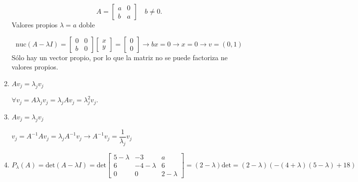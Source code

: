 \begin{enumerate}[label=\color{red}\textbf{\arabic*)}]
    \[
    A=\begin{bmatrix} 
        a & 0\\ b & a 
    \end{bmatrix} \quad b\neq 0.
    \] 
    Valores propios $\lambda = a$ doble

    \[
    \mathrm{nuc}(A-\lambda I)=\begin{bmatrix} 
        0 & 0\\
        b & 0
    \end{bmatrix}\begin{bmatrix} 
    x\\y 
    \end{bmatrix}  =\begin{bmatrix} 
    0\\0 
    \end{bmatrix} \longrightarrow bx=0\longrightarrow x=0\longrightarrow v=(0,1)
    \] 
    Sólo hay un vector propio, por lo que la matriz no se puede factoriza ne valores propios.
    \item {}

        $Av_j=\lambda_jv_j$

        $\forall v_j=A\lambda_jv_j=\lambda_jAv_j=\lambda_j^2v_j.$
    \item {}

        $Av_j=\lambda_jv_j$

        $v_{j}=A^{-1}Av_j=\lambda_jA^{-1}v_j\longrightarrow A^{-1}v_j=\dfrac{1}{\lambda_j}v_j$
    \item {}

    $P_{\lambda}(A)=\mathrm{det}(A-\lambda I)=\mathrm{det}\begin{bmatrix} 
        5-\lambda & -3 & a\\
        6 & -4-\lambda & 6\\
        0 & 0 & 2-\lambda
    \end{bmatrix}=(2-\lambda)\mathrm{det}=(2-\lambda)(-(4+\lambda)(5-\lambda)+18) $


\end{enumerate}
